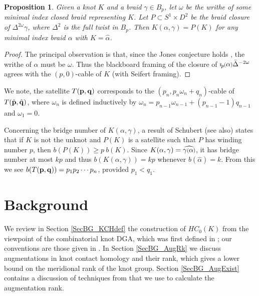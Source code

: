 \documentclass[11pt]{amsart}
\newcommand*{\smallp}[1]{\scalebox{.75}{\ensuremath#1}}
\newcommand{\pp}[2][p]{\imath_{\hspace*{-1pt}#1}\hspace*{-.5pt}\smallp(#2\smallp)}
\newtheorem{prop}[thm]{Proposition}
\theoremstyle{definition}
\begin{document}
\begin{prop}\label{PropAsSatelliteOp}Given a knot $K$ and a braid $\gamma\in B_p$, let $\omega$ be the writhe of some minimal index closed braid representing $K$. Let $P\subset S^1\times D^2$ be the braid closure of $\Delta^{2\omega}\gamma$, where $\Delta^2$ is the full twist in $B_p$. Then $K(\alpha,\gamma) = P(K)$ for any minimal index braid $\alpha$ with $K=\hat{\alpha}$.
\end{prop}
\begin{proof}The principal observation is that, since the Jones conjecture holds \cite{DP12,LM12}, the writhe of $\alpha$ must be $\omega$. Thus the blackboard framing of the closure of $\pp\alpha\bar\Delta^{-2\omega}$ agrees with the $(p,0)$-cable of $K$ (with Seifert framing).
\end{proof}

We note, the satellite $T({\bf p},{\bf q})$ corresponds to the $(p_n,p_n\omega_n+q_n)$-cable of $T(\hat{\bf p},\hat{\bf q})$, where $\omega_n$ is defined inductively by $\omega_n=p_{n-1}\omega_{n-1}+(p_{n-1}-1)q_{n-1}$ and $\omega_1=0$.

Concerning the bridge number of $K(\alpha,\gamma)$, a result of Schubert \cite{Schub} (see \cite{Schul} also) states that if $K$ is not the unknot and $P(K)$ is a satellite such that $P$ has winding number $p$, then $b(P(K)) \ge p\ b(K)$. Since $K(\alpha,\gamma) = \widehat{\gamma\smallp(\alpha\smallp)}$, it has bridge number at most $kp$ and thus $b(K(\alpha,\gamma)) = kp$ whenever $b(\hat\alpha) = k$. From this we see $b(T({\bf p},{\bf q})) = p_1p_2\cdots p_n$, provided $p_1 < q_1$.

\section{Background}
\label{SecBG}

  We review in Section \ref{SecBG_KCHdef} the construction of $HC_0(K)$ from the viewpoint of the combinatorial knot DGA, which was first defined in \cite{Ng08}; our conventions are those given in \cite{Ng12}. In Section \ref{SecBG_AugRk} we discuss augmentations in knot contact homology and their rank, which gives a lower bound on the meridional rank of the knot group. Section \ref{SecBG_AugExist} contains a discussion of techniques from \cite{Cor13a} that we use to calculate the augmentation rank.
\end{document}

